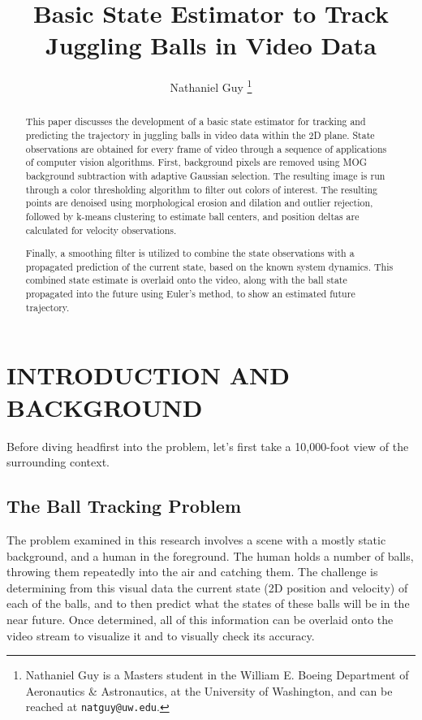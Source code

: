 \documentclass[letterpaper, 10 pt, conference]{ieeeconf}  %
\title{\LARGE \bf
Basic State Estimator to Track Juggling Balls in Video Data\\
}
\author{Nathaniel Guy%
\thanks{Nathaniel Guy is a Masters student in the William E. Boeing Department of Aeronautics \& Astronautics, at the University of Washington, and can be reached at {\tt\small natguy@uw.edu}.}%
}
\begin{document}
\maketitle
\thispagestyle{empty}
\pagestyle{empty}

\begin{abstract}

This paper discusses the development of a basic state estimator for tracking and predicting the trajectory in juggling balls in video data within the 2D plane. State observations are obtained for every frame of video through a sequence of applications of computer vision algorithms. First, background pixels are removed using MOG background subtraction with adaptive Gaussian selection. The resulting image is run through a color thresholding algorithm to filter out colors of interest. The resulting points are denoised using morphological erosion and dilation and outlier rejection, followed by k-means clustering to estimate ball centers, and position deltas are calculated for velocity observations.

Finally, a smoothing filter is utilized to combine the state observations with a propagated prediction of the current state, based on the known system dynamics. This combined state estimate is overlaid onto the video, along with the ball state propagated into the future using Euler's method, to show an estimated future trajectory.

\end{abstract}

\section{INTRODUCTION AND BACKGROUND}

Before diving headfirst into the problem, let's first take a 10,000-foot view of the surrounding context.

\subsection{The Ball Tracking Problem}

The problem examined in this research involves a scene with a mostly static background, and a human in the foreground. The human holds a number of balls, throwing them repeatedly into the air and catching them. The challenge is determining from this visual data the current state (2D position and velocity) of each of the balls, and to then predict what the states of these balls will be in the near future. Once determined, all of this information can be overlaid onto the video stream to visualize it and to visually check its accuracy.
\end{document}
